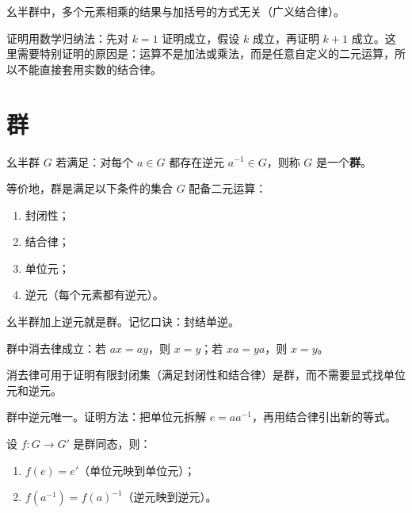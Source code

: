 \begin{proposition}[广义结合律与数学归纳法]
幺半群中，多个元素相乘的结果与加括号的方式无关（广义结合律）。

证明用数学归纳法：先对 $k=1$ 证明成立，假设 $k$ 成立，再证明 $k+1$ 成立。这里需要特别证明的原因是：运算不是加法或乘法，而是任意自定义的二元运算，所以不能直接套用实数的结合律。
\end{proposition}

\section{群}

\begin{definition}[群（定义 1.9）]
幺半群 $G$ 若满足：对每个 $a \in G$ 都存在逆元 $a^{-1} \in G$，则称 $G$ 是一个\textbf{群}。

等价地，群是满足以下条件的集合 $G$ 配备二元运算：
\begin{enumerate}
  \item 封闭性；
  \item 结合律；
  \item 单位元；
  \item 逆元（每个元素都有逆元）。
\end{enumerate}
\end{definition}

\begin{note}
幺半群加上逆元就是群。记忆口诀：封结单逆。
\end{note}

\begin{proposition}[消去律]
群中消去律成立：若 $ax = ay$，则 $x = y$；若 $xa = ya$，则 $x = y$。

消去律可用于证明有限封闭集（满足封闭性和结合律）是群，而不需要显式找单位元和逆元。
\end{proposition}

\begin{proposition}[命题 1.7]
群中逆元唯一。证明方法：把单位元拆解 $e = a a^{-1}$，再用结合律引出新的等式。
\end{proposition}

\begin{proposition}[命题 1.13：同态保特殊元素]
设 $f\colon G \to G'$ 是群同态，则：
\begin{enumerate}
  \item $f(e) = e'$（单位元映到单位元）；
  \item $f(a^{-1}) = f(a)^{-1}$（逆元映到逆元）。
\end{enumerate}
\end{proposition}

